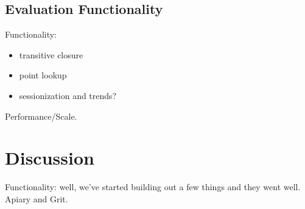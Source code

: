 \documentclass{sig-alternate}
\begin{document}



\subsection{Evaluation Functionality}

Functionality:
\begin{itemize}
\item transitive closure
\item point lookup
\item sessionization and trends?
\end{itemize}

Performance/Scale.

\section{Discussion}
\label{sec:discussion}

Functionality: well, we've started building out a few things and they went well.  Apiary and Grit.
\end{document}

